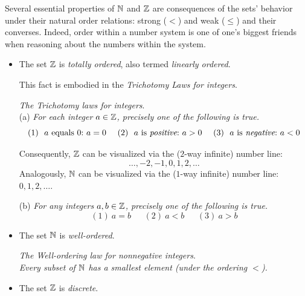 Several essential properties of $\mathbb{N}$ and $\mathbb{Z}$ are consequences of the
sets' behavior under their natural order relations: strong ($<$) and
weak ($\leq$) and their converses.  Indeed, order within a number
system is one of one's biggest friends when reasoning about the
numbers within the system.
\begin{itemize}
\item
The set $\mathbb{Z}$ is {\em totally ordered}, also termed {\em linearly
  ordered}.

\smallskip

This fact is embodied in the {\em Trichotomy Laws for
  integers}.

\medskip

{\it The Trichotomy laws for integers}. \\
%
(a)
%
{\it For each integer $a \in \mathbb{Z}$, precisely one of the following is true.}
\[
(1) \ \mbox{ $a$ equals $0$:} \ a=0 \ \ \ \
(2) \ \mbox{ $a$ is {\em positive}:} \ a>0 \ \ \ \
(3) \ \mbox{ $a$ is {\em negative}:} \ a<0
\]

Consequently, $\mathbb{Z}$ can be visualized via the ($2$-way infinite) number
line:
\index{number!the number line}
\[ \ldots, -2, -1, 0, 1, 2, \ldots
\]
Analogously, $\mathbb{N}$ can be visualized via the ($1$-way infinite) number
line: $0, 1, 2, \ldots$.

\medskip

(b)
%
{\it For any integers $a, b \in \mathbb{Z}$, precisely one of the following is
  true.}
\[ (1) \ a=b \ \ \ \ \ \ \ (2) \ a<b \ \ \ \ \ \ \ (3) \ a>b \]

\item
The set $\mathbb{N}$ is {\it well-ordered}.

\medskip

{\it The Well-ordering law for nonnegative integers}. \\
%
{\it Every subset of $\mathbb{N}$ has a smallest element (under the ordering
  $<$).}

\medskip

\item
The set $\mathbb{Z}$ is {\it discrete}.

\medskip


\end{itemize}
